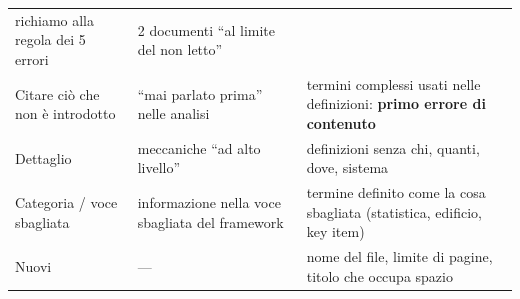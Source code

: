 \begin{table}[htbp]
\begin{tabular}{@{}p{3.3cm}p{4.0cm}p{4.4cm}@{}}
      richiamo alla regola dei 5 errori &
      2 documenti ``al limite del non letto'' \\
    \addlinespace
    Citare ciò che non è introdotto &
      ``mai parlato prima'' nelle analisi &
      termini complessi usati nelle definizioni: \textbf{primo errore di
      contenuto} \\
    \addlinespace
    Dettaglio &
      meccaniche ``ad alto livello'' &
      definizioni senza chi, quanti, dove, sistema \\
    \addlinespace
    Categoria / voce sbagliata &
      informazione nella voce sbagliata del framework &
      termine definito come la cosa sbagliata (statistica, edificio, key
      item) \\
    \addlinespace
    Nuovi &
      --- &
      nome del file, limite di pagine, titolo che occupa spazio \\
    \bottomrule
  \end{tabular}
\end{table}

